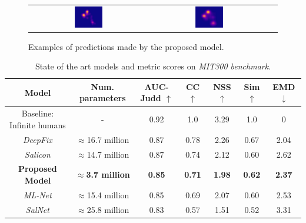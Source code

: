 \documentclass[conference]{IEEEtran}
\begin{document}
\begin{figure}
\begin{center}
\begin{tabular} {ccc}
    \includegraphics[width=0.25\textwidth]{./img/sign_gt.jpg} &
    \includegraphics[width=0.25\textwidth]{./img/sign_m.jpg}\\
    \end{tabular}
\end{center}
    \caption{Examples of predictions made by the proposed model.}
    \label{fig:preds}
\end{figure}

\begin{table}
	\small
    \begin{center}
    \caption{State of the art models and metric scores on
        \emph{MIT300 benchmark}.}
    \label{table:results}
    \begin{tabular}{|c|c|c|c|c|c|c|}
        \hline
        Model & Num. parameters & AUC-Judd $\uparrow$ & CC $\uparrow$
            & NSS $\uparrow$ & Sim $\uparrow$ & EMD $\downarrow$\\
        \hline
        Baseline: Infinite humans & - & 0.92 & 1.0 & 3.29 & 1.0 & 0\\
        \hline
        \emph{DeepFix} & $\approx$16.7 million & 0.87 & 0.78
            & 2.26 & 0.67 & 2.04\\
        \hline
        \emph{Salicon} & $\approx$14.7 million & 0.87 & 0.74 & 2.12
            & 0.60 & 2.62\\
        \hline
        \textbf{Proposed Model} & $\approx$\textbf{3.7 million}
            & \textbf{0.85} &
        \textbf{0.71} & \textbf{1.98} & \textbf{0.62} & \textbf{2.37}\\
        \hline
        \emph{ML-Net} & $\approx$15.4 million & 0.85 & 0.69 & 2.07 & 0.60
            & 2.53\\
        \hline
        \emph{SalNet} & $\approx$25.8 million & 0.83 & 0.57 & 1.51
            & 0.52 & 3.31\\
        \hline
    \end{tabular}
    \end{center}
\end{table}
\end{document}
